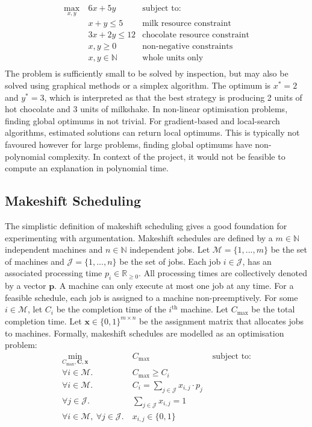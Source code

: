 \begin{align*}
	\max_{x,y}\ &6x+5y&\text{subject to:}\\
	&x+y\leq 5&\text{milk resource constraint}\\
	&3x+2y\leq 12&\text{chocolate resource constraint}\\
	&x,y\geq 0&\text{non-negative constraints}\\
	&x,y\in\mathbb{N}&\text{whole units only}\\
\end{align*}
The problem is sufficiently small to be solved by inspection, but may also be solved using graphical methods or a simplex algorithm. The optimum is $x^*=2$ and $y^*=3$, which is interpreted as that the best strategy is producing 2 units of hot chocolate and 3 units of milkshake.
\linespace
In non-linear optimisation problems, finding global optimums in not trivial. For gradient-based and local-search algorithms, estimated solutions can return local optimums. This is typically not favoured however for large problems, finding global optimums have non-polynomial complexity. In context of the project, it would not be feasible to compute an explanation in polynomial time.

\subsection{Makeshift Scheduling}

The simplistic definition of makeshift scheduling gives a good foundation for experimenting with argumentation. Makeshift schedules are defined by a $m\in\mathbb{N}$ independent machines and $n\in\mathbb{N}$ independent jobs.\cite{sa} Let $\mathcal{M}=\{1,...,m\}$ be the set of machines and $\mathcal{J}=\{1,...,n\}$ be the set of jobs. Each job $i\in\mathcal{J}$, has an associated processing time $p_i\in\mathbb{R}_{\geq 0}$. All processing times are collectively denoted by a vector $\mathbf{p}$. A machine can only execute at most one job at any time. For a feasible schedule, each job is assigned to a machine non-preemptively. For some $i\in\mathcal{M}$, let $C_i$ be the completion time of the $i^\text{th}$ machine. Let $C_{\max}$ be the total completion time. Let $\mathbf{x}\in\{0,1\}^{m\times n}$ be the assignment matrix that allocates jobs to machines. Formally, makeshift schedules are modelled as an optimisation problem:
\begin{align*}
	\min_{C_{\max},\mathbf{C},\mathbf{x}}&C_{\max}&\text{ subject to:}\\
	\forall i\in\mathcal{M}.\ &C_{\max}\geq C_i\\
	\forall i\in\mathcal{M}.\ &C_i=\sum_{j\in\mathcal{J}}x_{i,j}\cdot p_j\\
	\forall j\in\mathcal{J}.\ &\sum_{j\in\mathcal{J}}x_{i,j}=1\\
	\forall i\in\mathcal{M},\ \forall j\in\mathcal{J}.\ &x_{i,j}\in\{0,1\}
\end{align*}

